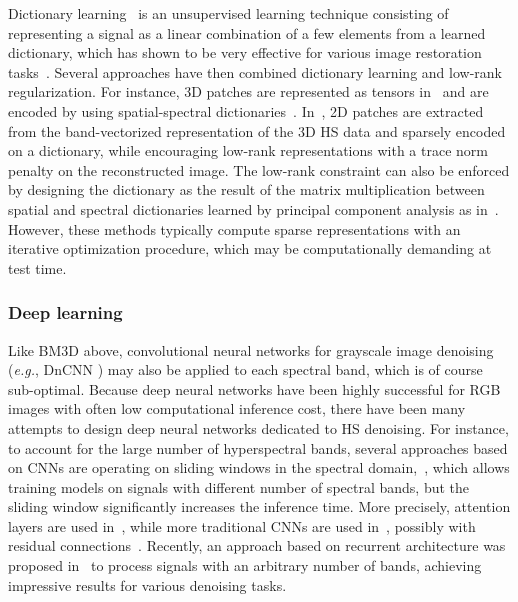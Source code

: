 Dictionary learning~\cite{olshausen_emergence_1996} is an unsupervised learning technique consisting of representing a signal as a linear combination of a few elements from a learned dictionary, which has shown to be very effective for various image restoration tasks~\cite{elad_image_2006, mairal_sparse_2007}.
Several approaches have then combined dictionary learning and low-rank regularization.
For instance, 3D patches are represented as tensors in~\cite{peng_decomposable_2014} and are encoded by using spatial-spectral dictionaries~\cite{tucker_mathematical_1966}.
In~\cite{zhao_hyperspectral_2015}, 2D patches are extracted from the band-vectorized representation of the 3D HS data and sparsely encoded on a dictionary, while encouraging low-rank representations with a trace norm penalty on the reconstructed image.
The low-rank constraint can also be enforced by designing the dictionary as the result of the matrix multiplication between spatial and spectral dictionaries learned by principal component analysis as in~\cite{fu_adaptive_2015}.
However, these methods typically compute sparse representations with an iterative optimization procedure, which may be computationally demanding at test time.

\subsubsection{Deep learning}

Like BM3D above, convolutional neural networks for grayscale image denoising (\emph{e.g.}, DnCNN \cite{zhang_beyond_2017}) may also be applied to each spectral band, which is of course sub-optimal.
Because deep neural networks have been highly successful for RGB images with often low computational inference cost, there have been many attempts to design deep neural networks dedicated to HS denoising.
For instance, to account for the large number of hyperspectral bands, several approaches based on CNNs are operating on sliding windows in the spectral domain,~\cite{maffei_single_2020, shi_hyperspectral_2021, yuan_hyperspectral_2019}, which allows training models on signals with different number of spectral bands, but the sliding window significantly increases the inference time.
More precisely, attention layers are used in~\cite{shi_hyperspectral_2021}, while more traditional CNNs are used in~\cite{maffei_single_2020}, possibly with residual connections~\cite{yuan_hyperspectral_2019}.
Recently, an approach based on recurrent architecture was proposed in~\cite{wei_3-d_2020} to process signals with an arbitrary number of bands, achieving impressive results for various denoising tasks.

